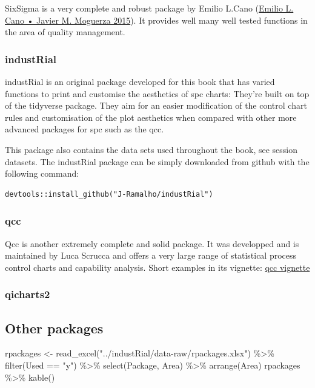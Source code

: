 \documentclass[
]{book}
\newenvironment{Shaded}{\begin{snugshade}}{\end{snugshade}}
\newcommand{\FunctionTok}[1]{\textcolor[rgb]{0.00,0.00,0.00}{#1}}
\newcommand{\NormalTok}[1]{#1}
\newcommand{\OtherTok}[1]{\textcolor[rgb]{0.56,0.35,0.01}{#1}}
\newcommand{\SpecialCharTok}[1]{\textcolor[rgb]{0.00,0.00,0.00}{#1}}
\newcommand{\StringTok}[1]{\textcolor[rgb]{0.31,0.60,0.02}{#1}}
\begin{document}
SixSigma is a very complete and robust package by Emilio L.Cano (\protect\hyperlink{ref-Cano2015}{Emilio L. Cano • Javier M. Moguerza 2015}). It provides well many well tested functions in the area of quality management.

\hypertarget{industrial}{%
\subsubsection{industRial}\label{industrial}}

industRial is an original package developed for this book that has varied functions to print and customise the aesthetics of spc charts: They're built on top of the tidyverse package. They aim for an easier modification of the control chart rules and customisation of the plot aesthetics when compared with other more advanced packages for spc such as the qcc.

This package also contains the data sets used throughout the book, see session datasets. The industRial package can be simply downloaded from github with the following command:

\begin{verbatim}
devtools::install_github("J-Ramalho/industRial")
\end{verbatim}

\hypertarget{qcc}{%
\subsubsection{qcc}\label{qcc}}

Qcc is another extremely complete and solid package. It was developped and is maintained by Luca Scrucca and offers a very large range of statistical process control charts and capability analysis. Short examples in its vignette: \href{https://luca-scr.github.io/qcc/articles/qcc.html}{qcc vignette}

\hypertarget{qicharts2}{%
\subsubsection{qicharts2}\label{qicharts2}}

\hypertarget{other-packages}{%
\subsection{Other packages}\label{other-packages}}

\begin{Shaded}
\begin{Highlighting}[]
\NormalTok{rpackages }\OtherTok{\textless{}{-}} \FunctionTok{read\_excel}\NormalTok{(}\StringTok{"../industRial/data{-}raw/rpackages.xlsx"}\NormalTok{) }\SpecialCharTok{\%\textgreater{}\%}
  \FunctionTok{filter}\NormalTok{(Used }\SpecialCharTok{==} \StringTok{"y"}\NormalTok{) }\SpecialCharTok{\%\textgreater{}\%}
  \FunctionTok{select}\NormalTok{(Package, Area) }\SpecialCharTok{\%\textgreater{}\%}
  \FunctionTok{arrange}\NormalTok{(Area)}
\NormalTok{rpackages }\SpecialCharTok{\%\textgreater{}\%}
  \FunctionTok{kable}\NormalTok{()}
\end{Highlighting}
\end{Shaded}
\end{document}
